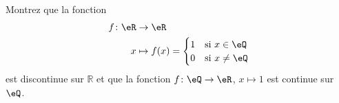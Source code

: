 
\begin{exercice}\label{exo0037}

Montrez que la fonction
\begin{equation}
	\begin{aligned}
		f\colon \eR&\to \eR \\
		x&\mapsto f(x)=\begin{cases}
	1	&	\text{si $x\in\eQ$}\\
	0	&	 \text{si $x\neq\eQ$}
\end{cases}
\end{aligned}
\end{equation}
est discontinue sur $\mathbb{R}$ et que la fonction $f\colon \eQ\to \eR$, $x\mapsto 1$ est continue sur $\eQ$.

\end{exercice}
